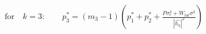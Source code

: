 \documentclass[preview]{standalone}
\begin{document}
\begin{align*}
\text{for} \quad k=3: \qquad p_3^\ast = \left(m_3 - 1\right) \left(p_1^\ast + p_2^\ast + \frac{P \sigma_\epsilon^2 + W_{tot} \sigma^2}{\left|\hat{h_3}\right|^2}\right)
\end{align*}
\end{document}
